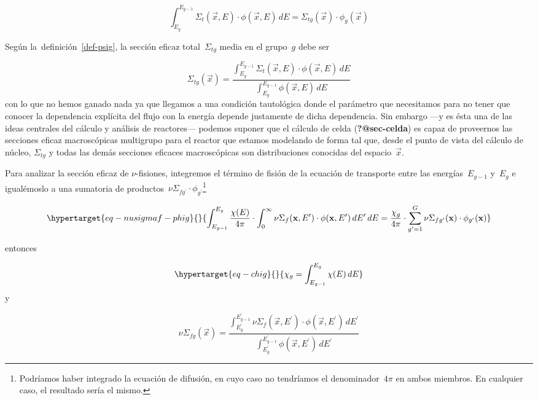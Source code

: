 \documentclass[
  12pt,
  a4paper,
  table]{scrbook}
\theoremstyle{plain}
\theoremstyle{definition}
\theoremstyle{plain}
\theoremstyle{plain}
\theoremstyle{remark}
\begin{document}
\[
\int_{E_g}^{E_{g-1}} \Sigma_t(\vec{x}, E) \cdot \phi(\vec{x}, E) \, dE =
\Sigma_{t g}(\vec{x}) \cdot \phi_g(\vec{x})
\]

Según la~definición~\ref{def-psig}, la sección eficaz
total~\(\Sigma_{t g}\) media en el grupo~\(g\) debe ser

\[
\Sigma_{t g}(\vec{x}) =
\frac{\displaystyle \int_{E_g}^{E_{g-1}} \Sigma_t(\vec{x}, E) \cdot \phi(\vec{x}, E) \, dE}{\displaystyle \int_{E_g}^{E_{g-1}} \phi(\vec{x}, E) \, dE}
\] con lo que no hemos ganado nada ya que llegamos a una condición
tautológica donde el parámetro que necesitamos para no tener que conocer
la dependencia explícita del flujo con la energía depende justamente de
dicha dependencia. Sin embargo ---y es ésta una de las ideas centrales
del cálculo y análisis de reactores--- podemos suponer que el cálculo de
celda (\textbf{?@sec-celda}) es capaz de proveernos las secciones eficaz
macroscópicas multigrupo para el reactor que estamos modelando de forma
tal que, desde el punto de vista del cálculo de núcleo, \(\Sigma_{t g}\)
y todas las demás secciones eficaces macroscópicas son distribuciones
conocidas del espacio~\(\vec{x}\).

Para analizar la sección eficaz de \(\nu\)-fisiones, integremos el
término de fisión de la ecuación de transporte entre las
energías~\(E_{g-1}\) y~\(E_g\) e igualémoslo a una sumatoria de
productos~\(\nu\Sigma_{fg^\prime} \cdot \phi_{g^\prime}\)\footnote{Podríamos
  haber integrado la ecuación de difusión, en cuyo caso no tendríamos el
  denominador~\(4\pi\) en ambos miembros. En cualquier caso, el
  resultado sería el mismo.}

\begin{equation}\protect\hypertarget{eq-nusigmaf-phig}{}{
\int_{E_{g-1}}^{E_g} \frac{\chi(E)}{4\pi} \cdot
\int_0^\infty \nu\Sigma_f(\vec{x},E^\prime) \cdot \phi(\vec{x}, E^\prime) \, dE^\prime \, dE
=
\frac{\chi_g}{4\pi} \cdot
\sum_{g^\prime=1}^G \nu\Sigma_{fg^\prime}(\vec{x}) \cdot \phi_{g^\prime}(\vec{x})
}\label{eq-nusigmaf-phig}\end{equation}

entonces

\begin{equation}\protect\hypertarget{eq-chig}{}{
\chi_g = \int_{E_{g-1}}^{E_g} \chi(E) \, dE
}\label{eq-chig}\end{equation} y

\[
\nu\Sigma_{f g}(\vec{x}) = \frac{\displaystyle \int_{E^\prime_g}^{E^\prime_{g-1}} \nu\Sigma_f(\vec{x}, E^\prime) \cdot \phi(\vec{x}, E^\prime) \, dE^\prime}{\displaystyle \int_{E^\prime_g}^{E^\prime_{g-1}} \phi(\vec{x}, E^\prime) \, dE^\prime}
\]
\end{document}
